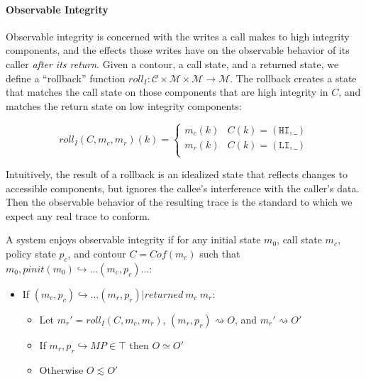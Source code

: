 \documentclass{article}
\begin{document}
    \paragraph{Observable Integrity}

      Observable integrity is concerned with the writes a call makes to high integrity components,
      and the effects those writes have on the observable behavior of its caller
      {\it after its return}. Given a contour, a call state, and a returned state, we define
      a ``rollback'' function \(\mathit{roll}_I : \mathcal{C} \times \mathcal{M} \times \mathcal{M}
      \rightarrow \mathcal{M}\). The rollback creates a state that matches the call
      state on those components that are high integrity in \(C\), and matches the return state
      on low integrity components:

      \[\mathit{roll}_I(C,m_c,m_r)(k) =
      \begin{cases}
        m_c(k) & C(k) = (\mathtt{HI},\_) \\
        m_r(k) & C(k) = (\mathtt{LI},\_) \\
      \end{cases}\]

      Intuitively, the result of a rollback is an idealized state that reflects changes to accessible
      components, but ignores the callee's interference with the caller's data. Then the observable
      behavior of the resulting trace is the standard to which we expect any real trace to conform.

      A system enjoys observable integrity if for any initial state \(m_0\), call state \(m_c\),
      policy state \(p_c\), and contour \(C = Cof(m_c)\) such that \(m_0,\mathit{pinit}(m_0)
      \hookrightarrow \dots (m_c,p_c) \dots\):

      \begin{itemize}
        \item If \((m_c,p_c) \hookrightarrow \dots (m_r,p_r) | \mathit{returned}\ m_c\ m_r\):
          \begin{itemize}
            \item Let \(m_r' = \mathit{roll}_I(C,m_c,m_r)\), \((m_r,p_r) \rightsquigarrow O\), and
              \(m_r' \rightsquigarrow O'\)
            \item If \(m_r,p_r \hookrightarrow MP \in \top\) then \(O \simeq O'\)
            \item Otherwise \(O \lesssim O'\)
          \end{itemize}
      \end{itemize}
\end{document}
